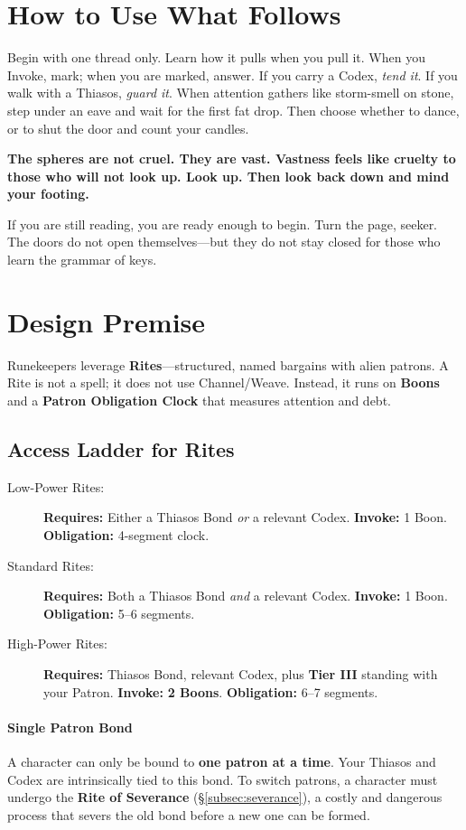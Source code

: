 \documentclass[12pt,twoside]{book}
\newcommand{\whisper}[1]{\textbf{#1}}
\begin{document}
\section*{How to Use What Follows}
Begin with one thread only. Learn how it pulls when you pull it. When you Invoke, mark; when you are marked, answer. If you carry a Codex, \emph{tend it}. If you walk with a Thiasos, \emph{guard it}. When attention gathers like storm-smell on stone, step under an eave and wait for the first fat drop. Then choose whether to dance, or to shut the door and count your candles.

\whisper{The spheres are not cruel. They are vast. Vastness feels like cruelty to those who will not look up. Look up. Then look back down and mind your footing.}

If you are still reading, you are ready enough to begin. Turn the page, seeker. The doors do not open themselves—but they do not stay closed for those who learn the grammar of keys.

\section{Design Premise}
Runekeepers leverage \textbf{Rites}---structured, named bargains with alien patrons. A Rite is not a spell; it does not use Channel/Weave. Instead, it runs on \textbf{Boons} and a \textbf{Patron Obligation Clock} that measures attention and debt.

\subsection*{Access Ladder for Rites}
\begin{description}
  \item[Low-Power Rites:] \textbf{Requires:} Either a Thiasos Bond \emph{or} a relevant Codex. \textbf{Invoke:} 1 Boon. \textbf{Obligation:} 4-segment clock.
  \item[Standard Rites:] \textbf{Requires:} Both a Thiasos Bond \emph{and} a relevant Codex. \textbf{Invoke:} 1 Boon. \textbf{Obligation:} 5–6 segments.
  \item[High-Power Rites:] \textbf{Requires:} Thiasos Bond, relevant Codex, plus \textbf{Tier III} standing with your Patron. \textbf{Invoke:} \textbf{2 Boons}. \textbf{Obligation:} 6–7 segments.
\end{description}

\paragraph{Single Patron Bond}
A character can only be bound to \textbf{one patron at a time}. Your Thiasos and Codex are intrinsically tied to this bond. To switch patrons, a character must undergo the \textbf{Rite of Severance} (\S\ref{subsec:severance}), a costly and dangerous process that severs the old bond before a new one can be formed.
\end{document}
